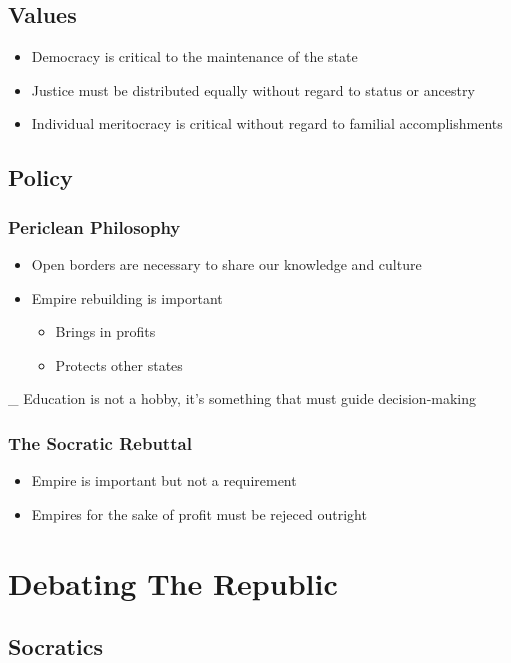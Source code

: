 \documentclass[11pt]{article}
\begin{document}
\subsection{Values}
\label{sec:orgd0d32b3}
\begin{itemize}
\item Democracy is critical to the maintenance of the state
\item Justice must be distributed equally without regard to status or ancestry
\item Individual meritocracy is critical without regard to familial accomplishments
\end{itemize}
\subsection{Policy}
\label{sec:orgc924bd9}
\subsubsection{Periclean Philosophy}
\label{sec:orgd9c9df0}
\begin{itemize}
\item Open borders are necessary to share our knowledge and culture
\item Empire rebuilding is important
\begin{itemize}
\item Brings in profits
\item Protects other states
\end{itemize}
\end{itemize}
\_ Education is not a hobby, it's something that must guide decision-making
\subsubsection{The Socratic Rebuttal}
\label{sec:orgabf9394}
\begin{itemize}
\item Empire is important but not a requirement
\item Empires for the sake of profit must be rejeced outright
\end{itemize}
\section{Debating The Republic}
\label{sec:org0714746}
\subsection{Socratics}
\label{sec:orgf0c27d7}
\end{document}
